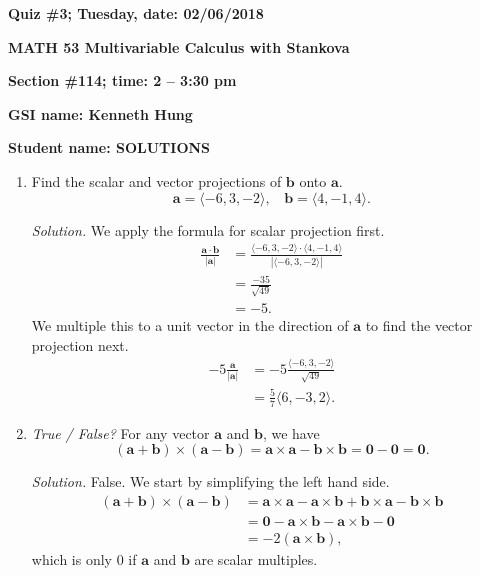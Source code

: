 \documentclass{article}
\begin{document}
{\bf Quiz \#3; Tuesday, date: 02/06/2018}

{\bf MATH 53 Multivariable Calculus with Stankova}

{\bf Section \#114; time: 2 -- 3:30 pm}

{\bf GSI name: Kenneth Hung}

{\bf Student name: SOLUTIONS}

\vspace*{0.25in}

\begin{enumerate}
\item Find the scalar and vector projections of $\mathbf{b}$ onto $\mathbf{a}$.
\[
\mathbf{a} = \langle -6, 3, -2\rangle , ~~~~ \mathbf{b} = \langle 4, -1, 4\rangle.
\]

{\em Solution.} We apply the formula for scalar projection first.
\begin{align*}
\frac{\mathbf{a} \cdot \mathbf{b}}{|\mathbf{a}|} & = \frac{\langle -6, 3, -2\rangle \cdot \langle 4, -1, 4\rangle}{|\langle -6, 3, -2\rangle|} \\
& = \frac{-35}{\sqrt{49}} \\
& = -5.
\end{align*}
We multiple this to a unit vector in the direction of $\mathbf{a}$ to find the vector projection next.
\begin{align*}
-5 \frac{\mathbf{a}}{|\mathbf{a}|} & = -5 \frac{\langle -6, 3, -2\rangle}{\sqrt{49}} \\
& = \frac{5}{7} \langle 6, -3, 2\rangle.
\end{align*}

\item {\em True / False?} For any vector $\mathbf{a}$ and $\mathbf{b}$, we have
\[
(\mathbf{a} + \mathbf{b}) \times (\mathbf{a} - \mathbf{b}) = \mathbf{a} \times \mathbf{a} - \mathbf{b} \times \mathbf{b} = \mathbf{0} - \mathbf{0} = \mathbf{0}.
\]

{\em Solution.} False. We start by simplifying the left hand side.
\begin{align*}
(\mathbf{a} + \mathbf{b}) \times (\mathbf{a} - \mathbf{b}) & = \mathbf{a} \times \mathbf{a} - \mathbf{a} \times \mathbf{b} + \mathbf{b} \times \mathbf{a} - \mathbf{b} \times \mathbf{b} \\
& = \mathbf{0} - \mathbf{a} \times \mathbf{b} - \mathbf{a} \times \mathbf{b} - \mathbf{0} \\
& = -2 (\mathbf{a} \times \mathbf{b}),
\end{align*}
which is only $0$ if $\mathbf{a}$ and $\mathbf{b}$ are scalar multiples.


\end{enumerate}
\end{document}
